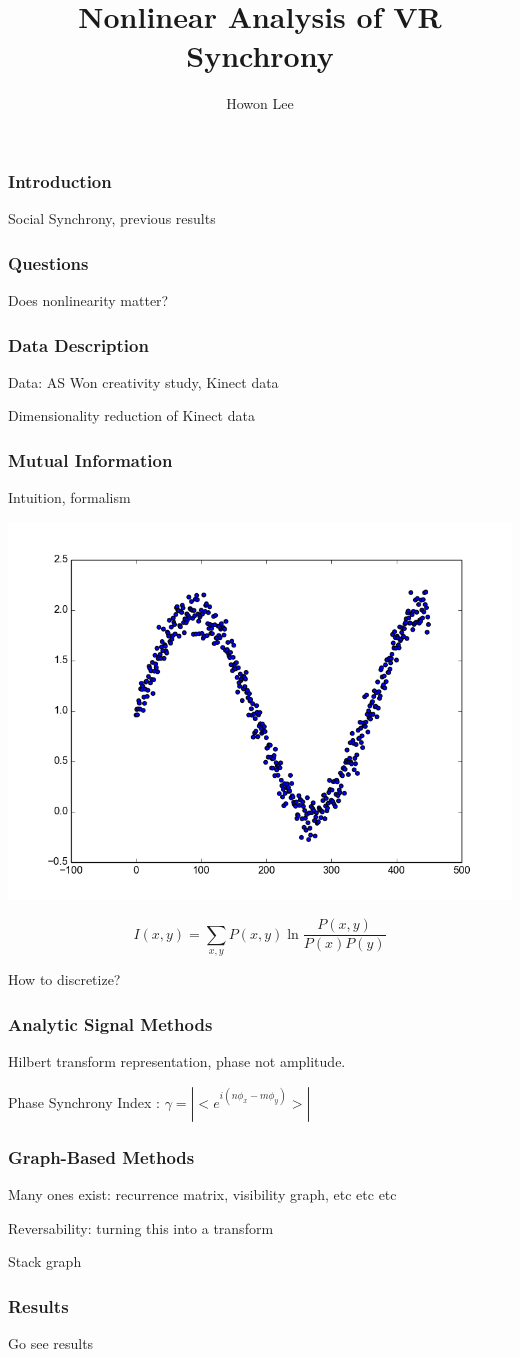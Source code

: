 \documentclass{beamer}
\begin{document}
\title{Nonlinear Analysis of VR Synchrony}
\author{Howon Lee}
\maketitle

\begin{frame}
  \frametitle{Introduction}
  Social Synchrony, previous results
\end{frame}
\begin{frame}
  \frametitle{Questions}
  Does nonlinearity matter?
\end{frame}
\begin{frame}
  \frametitle{Data Description}
  Data: AS Won creativity study, Kinect data

  Dimensionality reduction of Kinect data
\end{frame}
\begin{frame}
  \frametitle{Mutual Information}
  Intuition, formalism

  \includegraphics[scale=0.2]{mi_ex}
  
  $$I(x,y) = \sum_{x,y}P(x,y) \ln \frac{P(x,y)}{P(x)P(y)}$$

  How to discretize?
\end{frame}
\begin{frame}
  \frametitle{Analytic Signal Methods}
  Hilbert transform representation, phase not amplitude.

  Phase Synchrony Index : $\gamma = |<e^{i(n\phi_x - m\phi_y)}>|$
\end{frame}
\begin{frame}
  \frametitle{Graph-Based Methods}
  Many ones exist: recurrence matrix, visibility graph, etc etc etc

  Reversability: turning this into a transform

  Stack graph
\end{frame}
\begin{frame}
  \frametitle{Results}
  Go see results
\end{frame}
\end{document}
